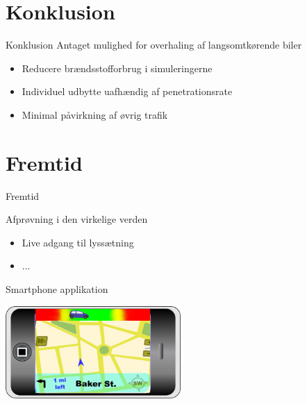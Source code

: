 \section{Konklusion}
\begin{frame}{Konklusion}
Antaget mulighed for overhaling af langsomtkørende biler
\begin{itemize}
\item Reducere brændsstofforbrug i simuleringerne
\item Individuel udbytte uafhændig af penetrationsrate
\item Minimal påvirkning af øvrig trafik
\end{itemize}
\end{frame}

\section{Fremtid}
\begin{frame}{Fremtid}

Afprøvning i den virkelige verden %
\begin{itemize}
\item Live adgang til lyssætning
\item ...
\end{itemize}

Smartphone applikation
\begin{center}
\includegraphics[width=0.5\textwidth]{images/product.png}
\end{center}
\end{frame}
